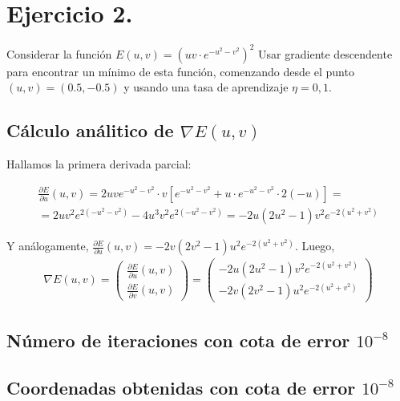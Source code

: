 \section{Ejercicio 2.}
Considerar la función $E(u, v) = \left( u v \cdot e^{ −u^2 −v^2 } \right) ^2$
Usar gradiente descendente para encontrar un mínimo de esta función, comenzando
desde el punto $(u, v) = (0.5, -0.5)$ y usando una tasa de aprendizaje $\eta = 0,1$.

\subsection{Cálculo análitico de \texorpdfstring{$\nabla E(u, v)$}{Lg}}

Hallamos la primera derivada parcial: 

\begin{equation}
\begin{aligned}
  \frac{\partial{E}}{\partial u}(u,v) = 2uve^{-u^2 - v^2} \cdot v \left[ e^{-u^2 - v^2} + u\cdot e^{-u^2 - v^2} \cdot 2(-u) \right] = \\
  = 2uv^2e^{2(-u^2-v^2)} - 4u^3v^2e^{2(-u^2-v^2)} = -2u (2u^2 - 1) v^2 e^{-2(u^2+v^2)}
\end{aligned}
\end{equation}

Y análogamente, $\frac{\partial{E}}{\partial u}(u,v) = -2v (2v^2 - 1) u^2 e^{-2(u^2+v^2)}$. Luego, 
\begin{equation}
  \begin{aligned}
    \nabla{E}(u,v) = \begin{pmatrix}
           \frac{\partial E}{\partial u}(u,v) \\
           \frac{\partial E}{\partial v}(u,v) 
    \end{pmatrix}  =  \begin{pmatrix}
          -2u (2u^2 - 1) v^2 e^{-2(u^2+v^2)} \\
          -2v (2v^2 - 1) u^2 e^{-2(u^2+v^2)}
    \end{pmatrix}
  \end{aligned}
\end{equation}


\subsection{Número de iteraciones con cota de error \texorpdfstring{$10^{-8}$}{Lg}}
\subsection{Coordenadas obtenidas con cota de error \texorpdfstring{$10^{-8}$}{Lg}}

